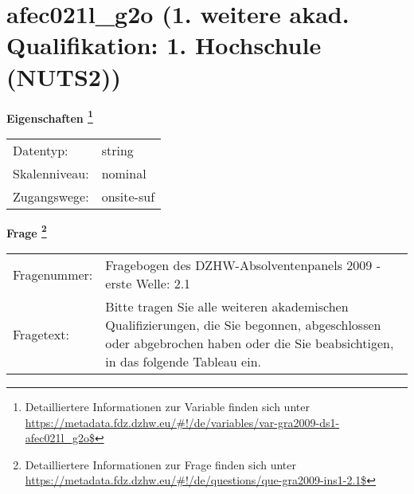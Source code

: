 
    \setcounter{footnote}{0}

    \vspace*{-1.8cm}
	\section{afec021l\_g2o (1. weitere akad. Qualifikation: 1. Hochschule (NUTS2))}
	\label{section:afec021l_g2o}



    \vspace*{0.5cm}
    \noindent\textbf{Eigenschaften
	\footnote{Detailliertere Informationen zur Variable finden sich unter
		\url{https://metadata.fdz.dzhw.eu/\#!/de/variables/var-gra2009-ds1-afec021l_g2o$}}}\\
	\begin{tabularx}{\hsize}{@{}lX}
	Datentyp: & string \\
	Skalenniveau: & nominal \\
	Zugangswege: &
	  onsite-suf
 \\
    \end{tabularx}



				\vspace*{0.5cm}
                \noindent\textbf{Frage
	                \footnote{Detailliertere Informationen zur Frage finden sich unter
		              \url{https://metadata.fdz.dzhw.eu/\#!/de/questions/que-gra2009-ins1-2.1$}}}\\
				\begin{tabularx}{\hsize}{@{}lX}
					Fragenummer: &
					  Fragebogen des DZHW-Absolventenpanels 2009 - erste Welle:
					  2.1
 \\
					Fragetext: & Bitte tragen Sie alle weiteren akademischen Qualifizierungen, die Sie begonnen, abgeschlossen oder abgebrochen haben oder die Sie beabsichtigen, in das folgende Tableau ein. \\
				\end{tabularx}






